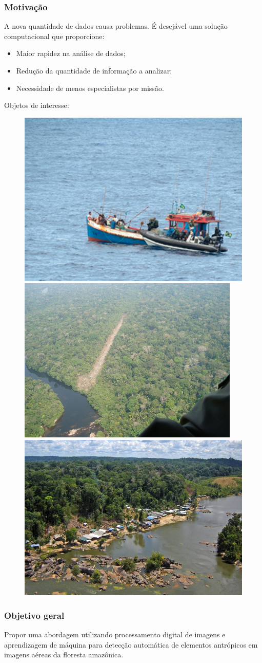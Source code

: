 \documentclass[t]{beamer}
\begin{document}
\begin{frame}[c]
\frametitle{Motivação}

A nova quantidade de dados causa problemas. É desejável uma solução computacional que proporcione:

\begin{itemize}
	\item Maior rapidez na análise de dados;
	\item Redução da quantidade de informação a analizar;
	\item Necessidade de menos especialistas por missão.
\end{itemize}

Objetos de interesse:
	\begin{figure}[h]
		\includegraphics[width=.3\textwidth]{imgs/pesca_ilegal}
		\hspace{0.1cm}
		\includegraphics[width=.3\textwidth]{imgs/pista_de_pouso}
		\hspace{0.1cm}
		\includegraphics[width=.32\textwidth]{imgs/garimpo}
	\end{figure}

\end{frame}

\begin{frame}[c]
\frametitle{Objetivo geral}

	Propor uma abordagem utilizando processamento digital de imagens e aprendizagem de máquina para detecção automática de elementos antrópicos em imagens aéreas da floresta amazônica.
\end{frame}
\end{document}
